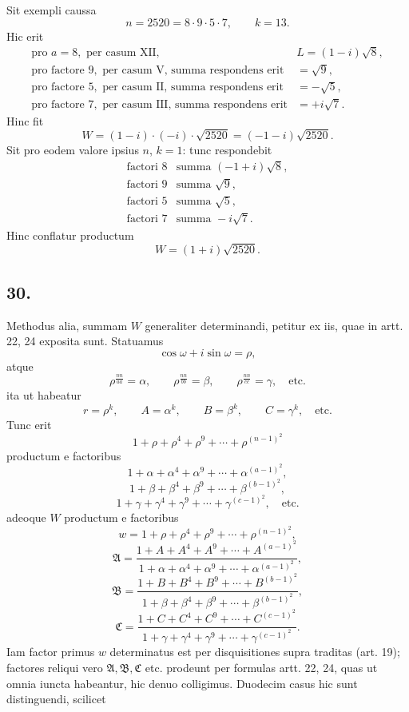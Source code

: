 \documentclass[12pt]{article}
\begin{document}
Sit exempli caussa
\[
n=2520=8\cdot9\cdot5\cdot7,\qquad k=13.
\]
Hic erit
\[
\begin{array}{ll}
\text{pro }a=8,\text{ per casum XII,} & L=(1-i)\sqrt8,\\
\text{pro factore }9,\text{ per casum V, summa respondens erit} & =\sqrt9,\\
\text{pro factore }5,\text{ per casum II, summa respondens erit} & =-\sqrt5,\\
\text{pro factore }7,\text{ per casum III, summa respondens erit} & =+i\sqrt7.
\end{array}
\]
Hinc fit
\[
W=(1-i)\cdot(-i)\cdot\sqrt{2520}=(-1-i)\sqrt{2520}.
\]
Sit pro eodem valore ipsius $n$, $k=1$: tunc respondebit
\[
\begin{array}{ll}
\text{factori }8 & \text{summa }(-1+i)\sqrt8,\\
\text{factori }9 & \text{summa }\sqrt9,\\
\text{factori }5 & \text{summa }\sqrt5,\\
\text{factori }7 & \text{summa }-i\sqrt7.
\end{array}
\]
Hinc conflatur productum
\[
W=(1+i)\sqrt{2520}.
\]

\subsection*{30.}

Methodus alia, summam $W$ generaliter determinandi, petitur ex iis, quae in artt. 22, 24 exposita sunt. Statuamus
\[
\cos\omega+i\sin\omega=\rho,
\]
atque
\[
\rho^{\frac{nn}{aa}}=\alpha,\qquad
\rho^{\frac{nn}{bb}}=\beta,\qquad
\rho^{\frac{nn}{cc}}=\gamma,\quad\text{etc.}
\]
ita ut habeatur
\[
r=\rho^k,\qquad A=\alpha^k,\qquad B=\beta^k,\qquad C=\gamma^k,\quad\text{etc.}
\]
Tunc erit
\[
1+\rho+\rho^4+\rho^9+\cdots+\rho^{(n-1)^2}
\]
productum e factoribus
\[
1+\alpha+\alpha^4+\alpha^9+\cdots+\alpha^{(a-1)^2},
\]
\[
1+\beta+\beta^4+\beta^9+\cdots+\beta^{(b-1)^2},
\]
\[
1+\gamma+\gamma^4+\gamma^9+\cdots+\gamma^{(c-1)^2},\quad\text{etc.}
\]
adeoque $W$ productum e factoribus
\[
w=1+\rho+\rho^4+\rho^9+\cdots+\rho^{(n-1)^2},
\]
\[
\mathfrak A=
\frac{1+A+A^4+A^9+\cdots+A^{(a-1)^2}}
{1+\alpha+\alpha^4+\alpha^9+\cdots+\alpha^{(a-1)^2}},
\]
\[
\mathfrak B=
\frac{1+B+B^4+B^9+\cdots+B^{(b-1)^2}}
{1+\beta+\beta^4+\beta^9+\cdots+\beta^{(b-1)^2}},
\]
\[
\mathfrak C=
\frac{1+C+C^4+C^9+\cdots+C^{(c-1)^2}}
{1+\gamma+\gamma^4+\gamma^9+\cdots+\gamma^{(c-1)^2}}.
\]
Iam factor primus $w$ determinatus est per disquisitiones supra traditas (art. 19); factores reliqui vero $\mathfrak A,\mathfrak B,\mathfrak C$ etc. prodeunt per formulas artt. 22, 24, quas ut omnia iuncta habeantur, hic denuo colligimus. Duodecim casus hic sunt distinguendi, scilicet
\end{document}
